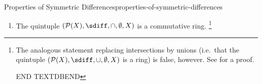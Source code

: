 \begin{proposition}{Properties of Symmetric Differences}{properties-of-symmetric-differences}
\begin{enumerate}
            \begin{enumerate}%
                \item The set of singletons sets on the elements of $X$ forms a basis for the $\F_{2}$-vector space $(\mathcal{P}(X),\alpha_{\mathcal{P}(X)})$ of \cref{properties-of-symmetric-differences-interaction-with-powersets-and-vector-spaces-1}.
                \item We have
                    \[
                        \dim(\mathcal{P}(X))%
                        =%
                        \#\mathcal{P}(X).%
                    \]%
            \end{enumerate}%
        \item\label{properties-of-symmetric-differences-interaction-with-powersets-and-rings}The quintuple $(\mathcal{P}(X),\sdiff,\cap,\emptyset,X)$ is a commutative ring.%
            \footnote{%
                \textdbend{}The analogous statement replacing intersections by unions (i.e.\ that the quintuple $(\mathcal{P}(X),\sdiff,\cup,\emptyset,X)$ is a ring) is false, however. See \cite{proof-wiki:symmetric-difference-with-union-does-not-form-ring} for a proof.

                END TEXTDBEND
                \par\vspace*{-1.75\baselineskip}
            }%
    \end{enumerate}
\end{proposition}
